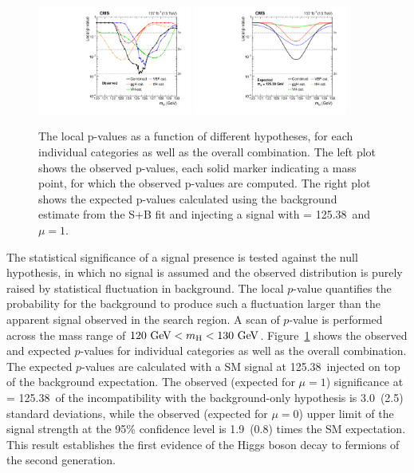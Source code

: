 \begin{figure}[!htb]
    \centering
    \captionsetup{justification=justified}
    \includegraphics[width=0.45\textwidth]{pics/results/p-value_obs.pdf}
    \includegraphics[width=0.45\textwidth]{pics/results/p-value_exp.pdf}
    \caption{The local p-values as a function of different \mh hypotheses, 
             for each individual categories as well as the overall combination.
             The left plot shows the observed p-values, 
             each solid marker indicating a mass point, for which the observed p-values are computed.
             The right plot shows the expected p-values calculated using the background estimate from the S+B fit 
             and injecting a signal with \mh = 125.38~\GeV and $\mu = 1$.}
    \label{fig:p_value_scan}
\end{figure}

The statistical significance of a signal presence is tested against the null hypothesis,
in which no signal is assumed and the observed distribution is purely raised by statistical fluctuation in background.
The local $p$-value quantifies the probability for the background to produce such a fluctuation larger than the apparent signal observed in the search region.
A scan of $p$-value is performed across the mass range of $120~\mbox{GeV}< m_{\mathrm{H}} < 130~\mbox{GeV}$.
Figure~\ref{fig:p_value_scan} shows the observed and expected $p$-values for individual categories as well as the overall combination.
The expected $p$-values are calculated with a SM signal at 125.38~\GeV injected on top of the background expectation.
The observed (expected for $\mu = 1$) significance at \mh = 125.38~\GeV of the incompatibility with the background-only hypothesis is 3.0~(2.5) standard deviations,
while the observed (expected for $\mu = 0$) upper limit of the signal strength at the 95\% confidence level is 1.9~(0.8) times the SM expectation.
This result establishes the first evidence of the Higgs boson decay to fermions of the second generation. 

